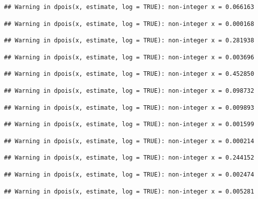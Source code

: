 \documentclass[]{article}
\begin{document}
\begin{verbatim}
## Warning in dpois(x, estimate, log = TRUE): non-integer x = 0.066163
\end{verbatim}

\begin{verbatim}
## Warning in dpois(x, estimate, log = TRUE): non-integer x = 0.000168
\end{verbatim}

\begin{verbatim}
## Warning in dpois(x, estimate, log = TRUE): non-integer x = 0.281938
\end{verbatim}

\begin{verbatim}
## Warning in dpois(x, estimate, log = TRUE): non-integer x = 0.003696
\end{verbatim}

\begin{verbatim}
## Warning in dpois(x, estimate, log = TRUE): non-integer x = 0.452850
\end{verbatim}

\begin{verbatim}
## Warning in dpois(x, estimate, log = TRUE): non-integer x = 0.098732
\end{verbatim}

\begin{verbatim}
## Warning in dpois(x, estimate, log = TRUE): non-integer x = 0.009893
\end{verbatim}

\begin{verbatim}
## Warning in dpois(x, estimate, log = TRUE): non-integer x = 0.001599
\end{verbatim}

\begin{verbatim}
## Warning in dpois(x, estimate, log = TRUE): non-integer x = 0.000214
\end{verbatim}

\begin{verbatim}
## Warning in dpois(x, estimate, log = TRUE): non-integer x = 0.244152
\end{verbatim}

\begin{verbatim}
## Warning in dpois(x, estimate, log = TRUE): non-integer x = 0.002474
\end{verbatim}

\begin{verbatim}
## Warning in dpois(x, estimate, log = TRUE): non-integer x = 0.005281
\end{verbatim}
\end{document}

